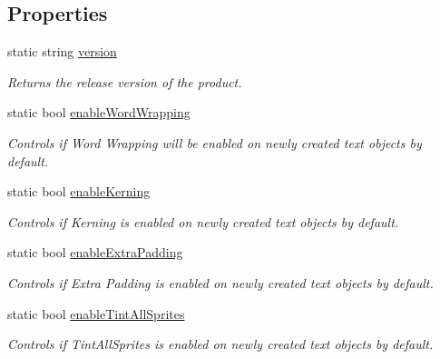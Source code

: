 \subsection*{Properties}
\begin{DoxyCompactItemize}
\item 
static string \mbox{\hyperlink{class_t_m_pro_1_1_t_m_p___settings_a38df8ce7c134d19b17a3eb3a761eba67}{version}}
\begin{DoxyCompactList}\small\item\em Returns the release version of the product. \end{DoxyCompactList}\item 
static bool \mbox{\hyperlink{class_t_m_pro_1_1_t_m_p___settings_afb5da705dc363bb384328fdc893c04ba}{enable\+Word\+Wrapping}}
\begin{DoxyCompactList}\small\item\em Controls if Word Wrapping will be enabled on newly created text objects by default. \end{DoxyCompactList}\item 
static bool \mbox{\hyperlink{class_t_m_pro_1_1_t_m_p___settings_a0b02a0da559ac7e517c8309046daadac}{enable\+Kerning}}
\begin{DoxyCompactList}\small\item\em Controls if Kerning is enabled on newly created text objects by default. \end{DoxyCompactList}\item 
static bool \mbox{\hyperlink{class_t_m_pro_1_1_t_m_p___settings_a444b85286edb5f6a127ec08b080d5e4a}{enable\+Extra\+Padding}}
\begin{DoxyCompactList}\small\item\em Controls if Extra Padding is enabled on newly created text objects by default. \end{DoxyCompactList}\item 
static bool \mbox{\hyperlink{class_t_m_pro_1_1_t_m_p___settings_acd54e15f66bbef3e4ac4d4d600a47c81}{enable\+Tint\+All\+Sprites}}
\begin{DoxyCompactList}\small\item\em Controls if Tint\+All\+Sprites is enabled on newly created text objects by default. \end{DoxyCompactList}\item 

\end{DoxyCompactItemize}
